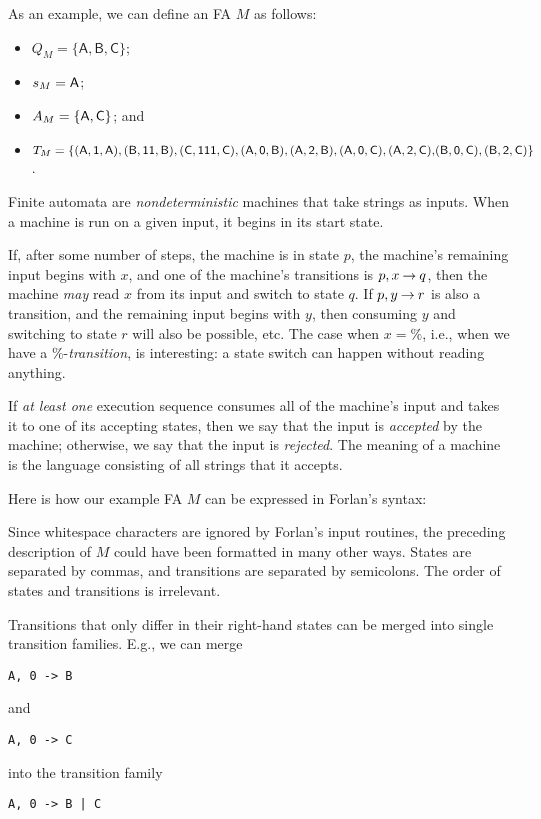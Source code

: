 As an example, we can define an FA $M$ as follows:
\begin{itemize}
\item $Q_M=\{\mathsf{A,B,C}\}$;

\item $s_M=\mathsf{A}$;

\item $A_M=\{\mathsf{A}, \mathsf{C}\}$; and

\item $T_M=\{\mathsf{(A,1,A), (B,11,B), (C,111,C),
  (A,0,B),(A,2,B),(A,0,C),(A,2,C),}\allowbreak\mathsf{(B,0,C), (B,2,C)}\}$.
\end{itemize}

Finite automata are \emph{nondeterministic} machines that take strings as
inputs.  When a machine is run on a given input, it begins in
its start state.

If, after some number of steps, the machine is in state $p$, the
machine's remaining input begins with $x$, and one of the machine's
transitions is $p,x\mathbin{\to} q$, then the machine \emph{may} read $x$ from
its input and switch to state $q$.  If $p, y\mathbin{\to} r$ is also a
transition, and the remaining input begins with $y$, then consuming
$y$ and switching to state $r$ will also be possible, etc.  The case
when $x=\%$, i.e., when we have a $\%$-\emph{transition}, is
interesting: a state switch can happen without reading anything.

If \emph{at least one} execution sequence consumes all of the machine's input
and takes it to one of its accepting states, then we say that the
input is \emph{accepted} by the machine; otherwise, we say that the
input is \emph{rejected}.  The meaning of a machine is the language
consisting of all strings that it accepts.

%
Here is how our example FA $M$ can be expressed in Forlan's syntax:

Since whitespace characters are ignored by Forlan's input routines,
the preceding description of $M$ could have been formatted in many other
ways.  States are separated by commas, and transitions are separated
by semicolons.  The order of states and transitions is irrelevant.

Transitions that only differ in their right-hand states can be
merged into single transition families.  E.g., we can merge
\begin{verbatim}
A, 0 -> B
\end{verbatim}
and
\begin{verbatim}
A, 0 -> C
\end{verbatim}
into the transition family
\begin{verbatim}
A, 0 -> B | C
\end{verbatim}

